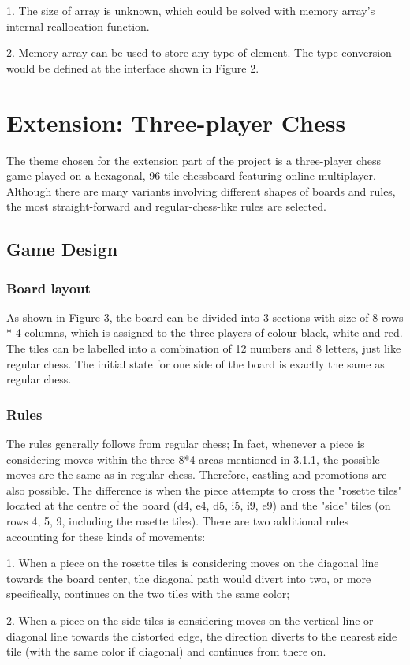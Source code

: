 \documentclass[10pt]{article}
\begin{document}
1. The size of array is unknown, which could be solved with memory array's internal reallocation function.
    
2. Memory array can be used to store any type of element. The type conversion would be defined at the interface shown in Figure 2.

\section{Extension: Three-player Chess}
The theme chosen for the extension part of the project is a three-player chess game played on a hexagonal, 96-tile chessboard featuring online multiplayer. Although there are many variants involving different shapes of boards and rules, the most straight-forward and regular-chess-like rules are selected.
\subsection{Game Design}
\subsubsection{Board layout}
As shown in Figure 3, the board can be divided into 3 sections with size of 8 rows * 4 columns, which is assigned to the three players of colour black, white and red. The tiles can be labelled into a combination of 12 numbers and 8 letters, just like regular chess. The initial state for one side of the board is exactly the same as regular chess.
\subsubsection{Rules}
The rules generally follows from regular chess; In fact, whenever a piece is considering moves within the three 8*4 areas mentioned in 3.1.1, the possible moves are the same as in regular chess. Therefore, castling and promotions are also possible. The difference is when the piece attempts to cross the "rosette tiles" located at the centre of the board (d4, e4, d5, i5, i9, e9) and the "side" tiles (on rows 4, 5, 9, including the rosette tiles). There are two additional rules accounting for these kinds of movements:

1. When a piece on the rosette tiles is considering moves on the diagonal line towards the board center, the diagonal path would divert into two, or more specifically, continues on the two tiles with the same color;

2. When a piece on the side tiles is considering moves on the vertical line or diagonal line towards the distorted edge, the direction diverts to the nearest side tile (with the same color if diagonal) and continues from there on.
\end{document}
